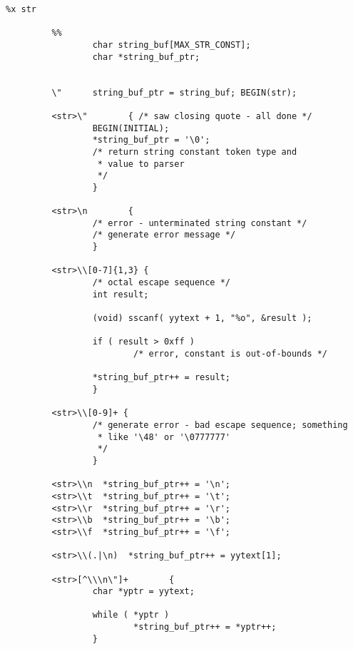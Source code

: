 \documentclass[openany,oneside]{book}
\begin{document}
\begin{verbatim}
%x str
     
         %%
                 char string_buf[MAX_STR_CONST];
                 char *string_buf_ptr;
     
     
         \"      string_buf_ptr = string_buf; BEGIN(str);
     
         <str>\"        { /* saw closing quote - all done */
                 BEGIN(INITIAL);
                 *string_buf_ptr = '\0';
                 /* return string constant token type and
                  * value to parser
                  */
                 }
     
         <str>\n        {
                 /* error - unterminated string constant */
                 /* generate error message */
                 }
     
         <str>\\[0-7]{1,3} {
                 /* octal escape sequence */
                 int result;
     
                 (void) sscanf( yytext + 1, "%o", &result );
     
                 if ( result > 0xff )
                         /* error, constant is out-of-bounds */
     
                 *string_buf_ptr++ = result;
                 }
     
         <str>\\[0-9]+ {
                 /* generate error - bad escape sequence; something
                  * like '\48' or '\0777777'
                  */
                 }
     
         <str>\\n  *string_buf_ptr++ = '\n';
         <str>\\t  *string_buf_ptr++ = '\t';
         <str>\\r  *string_buf_ptr++ = '\r';
         <str>\\b  *string_buf_ptr++ = '\b';
         <str>\\f  *string_buf_ptr++ = '\f';
     
         <str>\\(.|\n)  *string_buf_ptr++ = yytext[1];
     
         <str>[^\\\n\"]+        {
                 char *yptr = yytext;
     
                 while ( *yptr )
                         *string_buf_ptr++ = *yptr++;
                 }
\end{verbatim}
\end{document}
